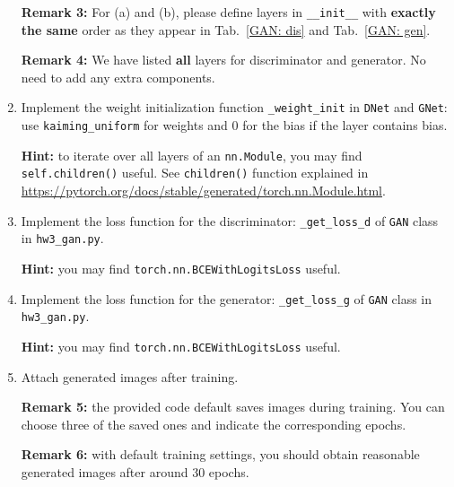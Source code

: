 \begin{Q}
\begin{enumerate}
		\textbf{Remark 3:} For (a) and (b), please define layers in \texttt{\_\_init\_\_} with \textbf{exactly the same} order as they appear in Tab.~\ref{GAN: dis} and Tab.~\ref{GAN: gen}.
		
		\textbf{Remark 4:} We have listed \textbf{all} layers for discriminator and generator. No need to add any extra components.
		
		\item Implement the weight initialization function \texttt{\_weight\_init} in \texttt{DNet} and \texttt{GNet}: use \texttt{kaiming\_uniform} for weights and 0 for the bias if the layer contains bias.
		
		\textbf{Hint:} to iterate over all layers of an \texttt{nn.Module}, you may find \texttt{self.children()} useful. See \texttt{children()} function explained in  \url{https://pytorch.org/docs/stable/generated/torch.nn.Module.html}.
		
		\item Implement the loss function for the discriminator: \texttt{\_get\_loss\_d} of \texttt{GAN} class in \texttt{hw3\_gan.py}.
		
		\textbf{Hint:} you may find \texttt{torch.nn.BCEWithLogitsLoss} useful.
		
		\item Implement the loss function for the generator: \texttt{\_get\_loss\_g} of \texttt{GAN} class in \texttt{hw3\_gan.py}.
		
		\textbf{Hint:} you may find \texttt{torch.nn.BCEWithLogitsLoss} useful.
		
		\item Attach generated images after training.
		
		\textbf{Remark 5:} the provided code default saves images during training. You can choose three of the saved ones and indicate the corresponding epochs.
		
		\textbf{Remark 6:} with default training settings, you should obtain reasonable generated images after around 30 epochs.
		
	\end{enumerate}
	
\end{Q}


